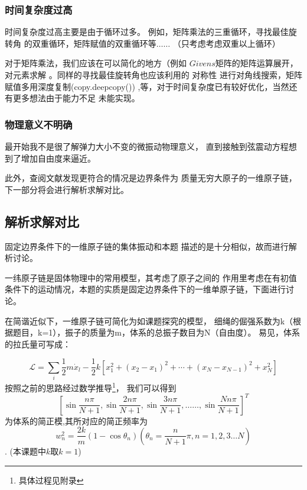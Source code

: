 \documentclass[11pt, a4paper, oneside]{ctexart}
\begin{document}
{{{\subsubsection{时间复杂度过高}

时间复杂度过高主要是由于循环过多。
例如，矩阵乘法的三重循环，寻找最佳旋转角
的双重循环，矩阵赋值的双重循环等$\dots\dots$
（只考虑考虑双重以上循环）

对于矩阵乘法，我们应该在可以简化的地方（例如
$Givens$矩阵的矩阵运算展开，对元素求解
。同样的寻找最佳旋转角也应该利用的
对称性
进行对角线搜索，矩阵赋值多用深度复制(copy.deepcopy())
,等，对于时间复杂度已有较好优化，当然还有更多想法由于能力不足
未能实现。

\subsubsection{物理意义不明确}

最开始我不是很了解弹力大小不变的微振动物理意义，
直到接触到弦震动方程想到了增加自由度来逼近。

此外，查阅文献发现更符合的情况是边界条件为
质量无穷大原子的一维原子链，下一部分将会进行解析求解对比。

    }
\subsection{解析求解对比}
{
    固定边界条件下的一维原子链的集体振动和本题
    描述的是十分相似，故而进行解析讨论。

    一纬原子链是固体物理中的常用模型，其考虑了原子之间的
    作用里考虑在有初值条件下的运动情况，本题的实质是固定边界条件下的一维单原子链，下面进行讨论。

    在简谐近似下，一维原子链可简化为如课题探究的模型，
    细绳的倔强系数为k（根据题目，k=1），振子的质量为m，体系的总振子数目为N（自由度）。
易见，\cite{g}体系的拉氏量可写成：

\begin{equation}
    \mathscr{L}=\sum_{i} \frac{1}{2} m \dot{x}_{l}-\frac{1}{2} k\left[x_{1}^{2}+\left(x_{2}-x_{1}\right)^{2}+\cdots+\left(x_{N}-x_{N-1}\right)^{2}+x_{N}^{2}\right]
    \end{equation}
按照之前的思路经过数学推导\footnote{具体过程见附录}，
我们可以得到
$$\left[\sin \frac{n \pi}{N+1}, \sin \frac{2 n \pi}{N+1}, \sin \frac{3 n \pi}{N+1}, \ldots \ldots, \sin \frac{N n \pi}{N+1}\right]^{T}$$ 
为体系的简正模,其所对应的简正频率为
 $$w_{n}^{2}=\frac{2 k}{m}\left(1-\cos \theta_{n}\right)\left(\theta_{n}=\frac{n}{N+1} \pi, n=1,2,3 \ldots N\right)$$.
(本课题中$k$取$k=1$)

}}}
\end{document}
